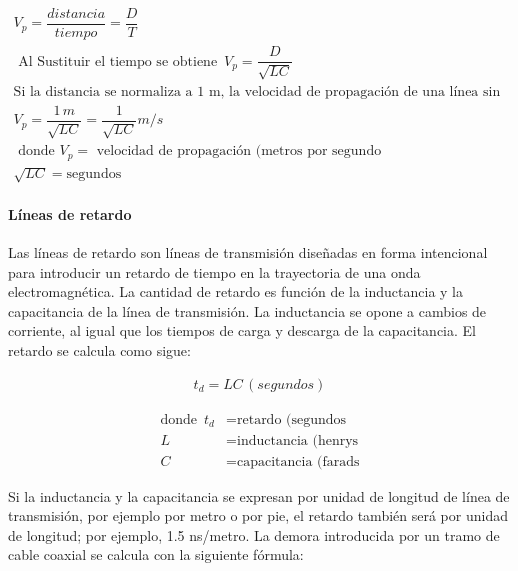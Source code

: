                 \begin{gather}
                    V_p = \dfrac{distancia}{tiempo} = \dfrac{D}{T} \nonumber \\[0.2cm] 
                    \text{ Al Sustituir el tiempo se obtiene } \, V_p = \dfrac{D}{\sqrt{LC}} \nonumber\\[0.2cm] 
                    \text{Si la distancia se normaliza a 1 m, la velocidad de propagación de una línea sin pérdidas es} \nonumber\\[0.2cm] 
                    V_p = \dfrac{1 \, m}{ \sqrt{LC}} = \dfrac{1}{\sqrt{LC}} m/s \label{eq:velocidad_real_propagacion} \\[0.2cm]
                    \text{ donde $V_p =$ velocidad de propagación (metros por segundo} \nonumber\\[0.2cm]
                    \sqrt{LC} = \text{segundos} \nonumber
                \end{gather}


            \paragraph{Líneas de retardo}

                Las líneas de retardo son líneas de transmisión diseñadas en forma intencional para introducir un retardo de tiempo en la trayectoria de una onda electromagnética. La cantidad de retardo es función de la inductancia y la capacitancia de la línea de transmisión. La inductancia se opone a cambios de corriente, al igual que los tiempos de carga y descarga de la capacitancia. El retardo se calcula como sigue:

                \begin{gather}
                    t_d= LC \, (segundos) \label{eq:ti_retardo}
                \end{gather}

                \begin{align*}
                    \text{donde } \, t_d &= \text{retardo (segundos} \\[0.2cm]
                    L &= \text{inductancia (henrys} \\[0.2cm]
                    C &= \text{capacitancia (farads} 
                \end{align*}

                Si la inductancia y la capacitancia se expresan por unidad de longitud de línea de transmisión, por ejemplo por metro o por pie, el retardo también será por unidad de longitud; por ejemplo, 1.5 ns/metro. 
                La demora introducida por un tramo de cable coaxial se calcula con la siguiente fórmula:

